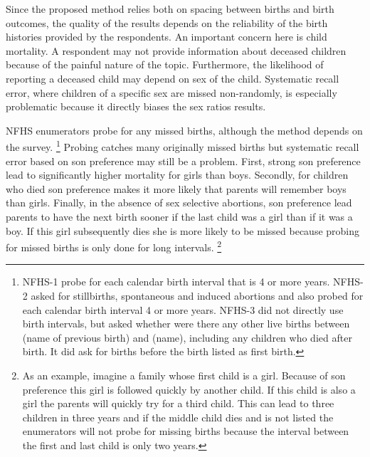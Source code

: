\documentclass[12pt,letterpaper]{article}
\begin{document}
Since the proposed method relies both on spacing between births and  birth outcomes, the 
quality of the results depends on the reliability of the birth 
histories provided by the respondents.
An important concern here is child mortality.
A respondent may not provide information about deceased children because of
the painful nature of the topic.
Furthermore, the likelihood of reporting a deceased child may depend on sex of the child. 
Systematic recall error, where children of a specific sex are missed non-randomly, 
is especially problematic because it directly biases the sex ratios results.

NFHS enumerators probe for any missed births, although the method depends on the survey.%
\footnote{%
NFHS-1 probe for each calendar birth interval that is 4 or more years.
NFHS-2 asked for stillbirths, spontaneous and induced abortions and also probed 
for each calendar birth interval 4 or more years.
NFHS-3 did not directly use birth intervals, but asked whether were there any other live births 
between (name of previous birth) and (name), including any children who died after birth. 
It did ask for births before the birth listed as first birth.
}
Probing catches many originally missed births but systematic recall error based on son
preference may still be a problem.
First, strong son preference lead to significantly higher mortality for girls than boys.
Secondly, for children who died son preference makes it more likely that parents will
remember boys than girls.
Finally, in the absence of sex selective abortions, son preference lead parents to have 
the next birth sooner if the last child was a girl than if it was a boy.
If this girl subsequently dies she is more likely to be missed because probing for missed 
births is only done for long intervals.%
\footnote{
As an example, imagine a family whose first child is a girl.
Because of son preference this girl is followed quickly by another child.
If this child is also a girl the parents will quickly try for a third child.
This can lead to three children in three years and
if the middle child dies and is not listed the enumerators will not probe for
missing births because the interval between the first and last child is only two years.
}
\end{document}
